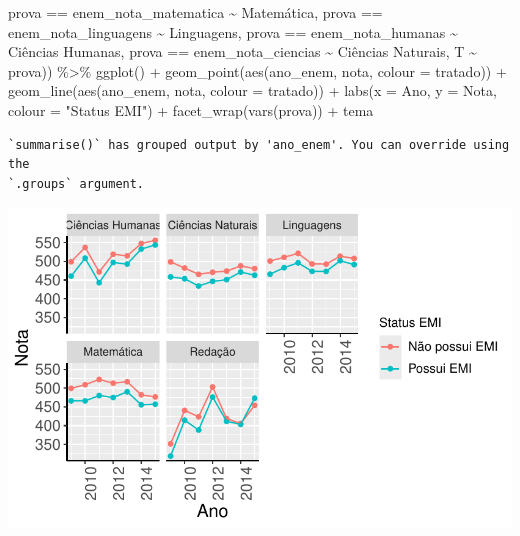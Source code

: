 \documentclass[
  letterpaper,
  DIV=11,
  numbers=noendperiod]{scrartcl}
\newenvironment{Shaded}{\begin{snugshade}}{\end{snugshade}}
\newcommand{\AttributeTok}[1]{\textcolor[rgb]{0.40,0.45,0.13}{#1}}
\newcommand{\FunctionTok}[1]{\textcolor[rgb]{0.28,0.35,0.67}{#1}}
\newcommand{\NormalTok}[1]{\textcolor[rgb]{0.00,0.23,0.31}{#1}}
\newcommand{\SpecialCharTok}[1]{\textcolor[rgb]{0.37,0.37,0.37}{#1}}
\newcommand{\StringTok}[1]{\textcolor[rgb]{0.13,0.47,0.30}{#1}}
\begin{document}
\begin{Shaded}
\begin{Highlighting}[]
\NormalTok{                           prova }\SpecialCharTok{==} \StringTok{\textquotesingle{}enem\_nota\_matematica\textquotesingle{}} \SpecialCharTok{\textasciitilde{}} \StringTok{\textquotesingle{}Matemática\textquotesingle{}}\NormalTok{,}
\NormalTok{                           prova }\SpecialCharTok{==} \StringTok{\textquotesingle{}enem\_nota\_linguagens\textquotesingle{}} \SpecialCharTok{\textasciitilde{}} \StringTok{\textquotesingle{}Linguagens\textquotesingle{}}\NormalTok{,}
\NormalTok{                           prova }\SpecialCharTok{==} \StringTok{\textquotesingle{}enem\_nota\_humanas\textquotesingle{}} \SpecialCharTok{\textasciitilde{}} \StringTok{\textquotesingle{}Ciências Humanas\textquotesingle{}}\NormalTok{,}
\NormalTok{                           prova }\SpecialCharTok{==} \StringTok{\textquotesingle{}enem\_nota\_ciencias\textquotesingle{}} \SpecialCharTok{\textasciitilde{}} \StringTok{\textquotesingle{}Ciências Naturais\textquotesingle{}}\NormalTok{,}
\NormalTok{                           T }\SpecialCharTok{\textasciitilde{}}\NormalTok{ prova)) }\SpecialCharTok{\%\textgreater{}\%} 
  \FunctionTok{ggplot}\NormalTok{() }\SpecialCharTok{+}
  \FunctionTok{geom\_point}\NormalTok{(}\FunctionTok{aes}\NormalTok{(ano\_enem, nota, }\AttributeTok{colour =}\NormalTok{ tratado)) }\SpecialCharTok{+}
  \FunctionTok{geom\_line}\NormalTok{(}\FunctionTok{aes}\NormalTok{(ano\_enem, nota, }\AttributeTok{colour =}\NormalTok{ tratado)) }\SpecialCharTok{+}
  \FunctionTok{labs}\NormalTok{(}\AttributeTok{x =} \StringTok{\textquotesingle{}Ano\textquotesingle{}}\NormalTok{, }\AttributeTok{y =} \StringTok{\textquotesingle{}Nota\textquotesingle{}}\NormalTok{, }\AttributeTok{colour =} \StringTok{"Status EMI"}\NormalTok{) }\SpecialCharTok{+}
  \FunctionTok{facet\_wrap}\NormalTok{(}\FunctionTok{vars}\NormalTok{(prova)) }\SpecialCharTok{+}
\NormalTok{  tema}
\end{Highlighting}
\end{Shaded}

\begin{verbatim}
`summarise()` has grouped output by 'ano_enem'. You can override using the
`.groups` argument.
\end{verbatim}

\includegraphics{script_files/figure-latex/unnamed-chunk-5-1.pdf}
\end{document}
